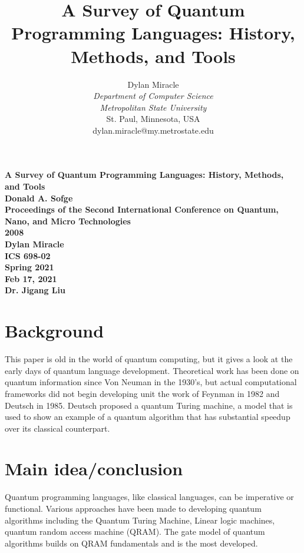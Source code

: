 \documentclass{article}
\begin{document}
\begin{titlepage}
    \begin{center}
        \vspace{4cm}
        \large
        \textbf{
            A Survey of Quantum Programming Languages: History, Methods, and Tools \\
            Donald A. Sofge \\
            Proceedings of the Second International Conference on Quantum, Nano, and Micro Technologies \\
            2008 \\
            Dylan Miracle \\
            ICS 698-02 \\
            Spring 2021 \\
            Feb 17, 2021 \\
            Dr. Jigang Liu
        }
    \end{center}
\end{titlepage}
\title{A Survey of Quantum Programming Languages: History, Methods, and Tools}

\author{Dylan Miracle\\
\textit{Department of Computer Science} \\
\textit{Metropolitan State University}\\
St. Paul, Minnesota, USA \\
dylan.miracle@my.metrostate.edu
}

\maketitle
\section{Background}
This paper is old in the world of quantum computing, but it gives a look at the early days of quantum language development. Theoretical work has been done on quantum information since Von Neuman in the 1930's, but actual computational frameworks did not begin developing unit the work of Feynman in 1982 and Deutsch in 1985. Deutsch proposed a quantum Turing machine, a model that is used to show an example of a quantum algorithm that has substantial speedup over its classical counterpart.
\section{Main idea/conclusion}
Quantum programming languages, like classical languages, can be imperative or functional. Various approaches have been made to developing quantum algorithms including the Quantum Turing Machine, Linear logic machines, quantum random access machine (QRAM). The gate model of quantum algorithms builds on QRAM fundamentals and is the most developed. 
\end{document}
